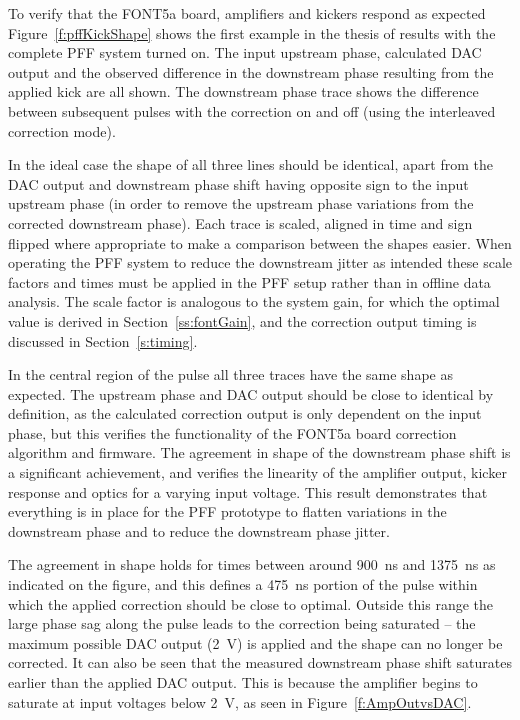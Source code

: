 To verify that the FONT5a board, amplifiers and kickers respond as expected Figure~\ref{f:pffKickShape} shows the first example in the thesis of results with the complete PFF system turned on. 
The input upstream phase, calculated DAC output and the observed difference in the downstream phase resulting from the applied kick are all shown. The downstream phase trace shows the difference between subsequent pulses with the correction on and off (using the interleaved correction mode). 

In the ideal case the shape of all three lines should be identical, apart from the DAC output and downstream phase shift having opposite sign to the input upstream phase (in order to remove the upstream phase variations from the corrected downstream phase).
Each trace is scaled, aligned in time and sign flipped where appropriate to make a comparison between the shapes easier.
When operating the PFF system to reduce the downstream jitter as intended these scale factors and times must be applied in the PFF
setup rather than in offline data analysis. The scale factor is analogous to the system gain, for which the optimal value is derived
in Section~\ref{ss:fontGain}, and the correction output timing is
discussed in Section~\ref{s:timing}.

In the central region of the pulse all three traces have the same shape as expected. The upstream phase and DAC output should be close to identical by definition, as the calculated correction output is only dependent on the input phase, but this verifies the functionality of the FONT5a board correction algorithm and firmware. The agreement in shape of the downstream phase shift is a significant achievement, and verifies the linearity of the amplifier output, kicker response and optics for a varying input voltage. This result demonstrates that everything is in place for the PFF prototype to flatten variations in the downstream phase and to reduce the downstream phase jitter.

The agreement in shape holds for times between around 900~ns and 1375~ns as indicated on the figure, and this defines a 475~ns portion of the pulse within which the applied correction should be close to optimal. Outside this range the large phase sag along the pulse leads 
to the correction being saturated -- the maximum possible DAC output 
(2~V) is applied and the shape can no longer be corrected. It can also
be seen that the measured downstream phase shift saturates earlier than
the applied DAC output. This is because the amplifier begins to 
saturate at input voltages below 2~V, as seen in Figure~\ref{f:AmpOutvsDAC}.


